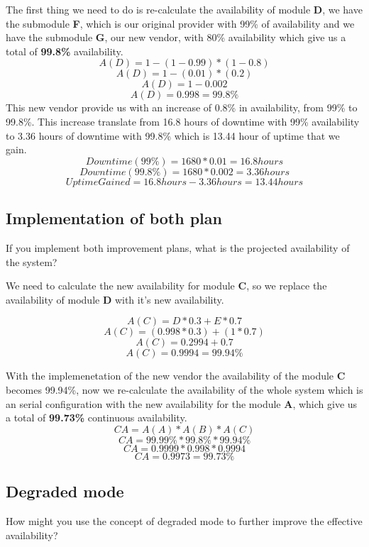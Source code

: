 \pagebreak
\noindent
The first thing we need to do is re-calculate the availability of 
module \textbf{D}, we have the submodule \textbf{F}, which is our original 
provider with 99\% of availability and we have the submodule \textbf{G}, our new 
vendor, with 80\% availability which give us a total of 
\textbf{99.8\%} availability.
\[ A(D) = 1 - (1 - 0.99) * (1 - 0.8) \]
\[ A(D) = 1 - (0.01) * (0.2) \]
\[ A(D) = 1 - 0.002 \]
\[ A(D) = 0.998 = 99.8\% \]
\noindent
This new vendor provide us with an increase of 0.8\% in availability, from 99\% 
to 99.8\%. This increase translate from 16.8 hours of downtime with 99\% availability
to 3.36 hours of downtime with 99.8\% which is 13.44 hour of uptime that we gain.
\[ Downtime(99\%) = 1680 * 0.01 = 16.8 hours\]
\[ Downtime(99.8\%) = 1680 * 0.002 = 3.36 hours\]
\[ Uptime Gained = 16.8 hours - 3.36 hours = 13.44 hours\]


\pagebreak

\subsection{Implementation of both plan}
If you implement both improvement plans, what is the projected 
availability of the system?\newline

\noindent
We need to calculate the new availability for module \textbf{C}, so we 
replace the availability of module \textbf{D} with it's new availability.

\[ A(C) = D * 0.3 + E * 0.7 \]
\[ A(C) = (0.998 * 0.3) + (1 * 0.7) \]
\[ A(C) =  0.2994 + 0.7 \]
\[ A(C) =  0.9994 = 99.94\% \]

\noindent
With the implemenetation of the new vendor the availability of the 
module \textbf{C} becomes 99.94\%, now we re-calculate the availability of the 
whole system which is an serial configuration with the new availability for the 
module \textbf{A}, which give us a total of \textbf{99.73\%} continuous availability.
\[ CA = A(A) * A(B) * A(C) \]
\[ CA =  99.99\% * 99.8\% * 99.94\%\]
\[ CA =  0.9999 * 0.998 * 0.9994\]
\[ CA = 0.9973 = 99.73\%\]

\pagebreak

\subsection{Degraded mode}
How might you use the concept of degraded mode to further improve the 
effective availability?\newline

